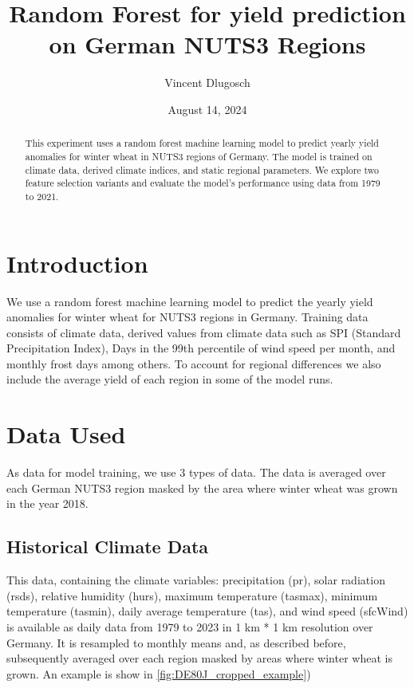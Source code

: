 \documentclass{article}
\title{Random Forest for yield prediction on German NUTS3 Regions}
\author{Vincent Dlugosch}
\begin{document}
\date{August 14, 2024}

\maketitle
\begin{abstract}
	This experiment uses a random forest machine learning model to predict yearly yield anomalies for winter wheat in NUTS3 regions of Germany. The model is trained on climate data, derived climate indices, and static regional parameters. We explore two feature selection variants and evaluate the model's performance using data from 1979 to 2021.
\end{abstract}

\tableofcontents
\section{Introduction}
We use a random forest machine learning model to predict the yearly yield anomalies for winter wheat for NUTS3 regions in Germany. Training data consists of climate data, derived values from climate data such as SPI (Standard Precipitation Index), Days in the 99th percentile of wind speed per month, and monthly frost days among others. To account for regional differences we also include the average yield of each region in some of the model runs.
\section{Data Used}
As data for model training, we use 3 types of data. The data is averaged over each German NUTS3 region masked by the area where winter wheat was grown in the year 2018.
\subsection{Historical Climate Data}
This data, containing the climate variables: precipitation (pr), solar radiation (rsds), relative humidity (hurs), maximum temperature (tasmax), minimum temperature (tasmin), daily average temperature (tas), and wind speed (sfcWind) is available as daily data from 1979 to 2023 in 1 km * 1 km resolution over Germany.
It is resampled to monthly means and, as described before, subsequently averaged over each region masked by areas where winter wheat is grown. An example is show in \ref{fig:DE80J_cropped_example})
\end{document}
